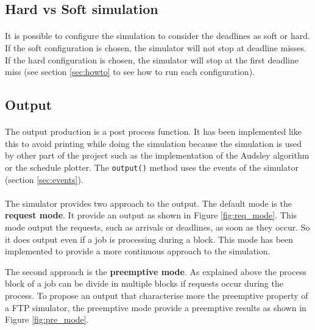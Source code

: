 \documentclass[letterpaper]{article}
\begin{document}
\subsection{Hard vs Soft simulation}

\paragraph{}


It is possible to configure the simulation to consider the deadlines as
soft or hard. If the soft configuration is chosen, the simulator will
not stop at deadline misses. If the hard configuration is chosen, the
simulator will stop at the first deadline miss (see section \ref{sec:howto}
to see how to run each configuration).

\subsection{Output}

\paragraph{}


The output production is a post process function. It has been implemented
like this to avoid printing while doing the simulation because the simulation
is used by other part of the project such as the implementation of the
Audsley algorithm or the schedule plotter. The \texttt{output()} method
uses the events of the simulator (section \ref{sec:events}).


\paragraph{}
The simulator provides two approach to the output. The default
mode is the \textbf{request mode}. It provide an output as shown in Figure
\ref{fig:req_mode}. This mode output the requests,
such as arrivals or deadlines, as soon as they occur. So it does output
even if a job is processing during a block.
This mode has been implemented
to provide a more continuous approach to the simulation.

The second approach is the \textbf{preemptive mode}. As explained above
the process block of a job can be divide in multiple blocks if requests
occur during the process. To propose an output that characterise more
the preemptive property of a FTP simulator, the preemptive mode provide
a preemptive results as shown in Figure \ref{fig:pre_mode}.
\end{document}
